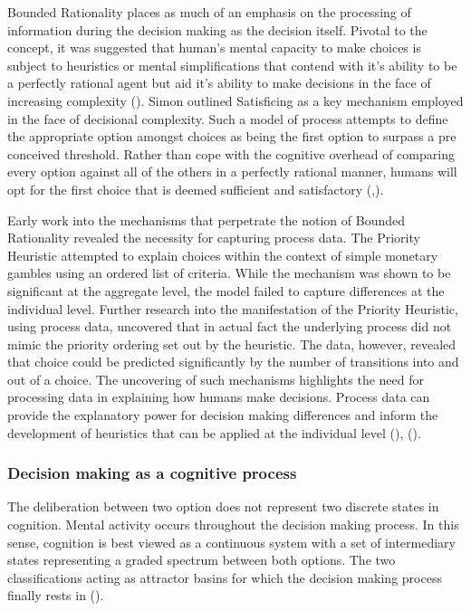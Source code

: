 \documentclass[man, floatsintext]{apa7}
\begin{document}
Bounded Rationality places as much of an emphasis on the processing of information during the decision making as the decision itself. Pivotal to the concept, it was suggested that human's mental capacity to make choices is subject to heuristics or mental simplifications that contend with it's ability to be a perfectly rational agent but aid it's ability to make decisions in the face of increasing complexity (\cite{payneTaskComplexityContingent1976}).  Simon outlined Satisficing as a key mechanism employed in the face of decisional complexity. Such a model of process attempts to define the appropriate option amongst choices as being the first option to surpass a pre conceived threshold. Rather than cope with the cognitive overhead of comparing every option against all of the others in a perfectly rational manner, humans will opt for the first choice that is deemed sufficient and satisfactory (\cite{simonBehavioralModelRational1955},\citeyear{simonRationalChoiceStructure1956d}).

Early work into the mechanisms that perpetrate the notion of Bounded Rationality revealed the necessity for capturing process data. The Priority Heuristic attempted to explain choices within the context of simple monetary gambles using an ordered list of criteria. While the mechanism was shown to be significant at the aggregate level, the model failed to capture differences at the individual level. Further research into the manifestation of the Priority Heuristic, using process data, uncovered that in actual fact the underlying process did not mimic the priority ordering set out by the heuristic. The data, however, revealed that choice could be predicted significantly by the number of transitions into and out of a choice. The uncovering of such mechanisms highlights the need for processing data in explaining how humans make decisions. Process data can provide the explanatory power for decision making differences and inform the development of heuristics that can be applied at the individual level (\cite{brandstatterPriorityHeuristicMaking2006}), (\cite{willemsenVisitingDecisionFactory2011}).

\subsubsection{Decision making as a cognitive process}

The deliberation between two option does not represent two discrete states in cognition. Mental activity occurs throughout the decision making process. In this sense, cognition is best viewed as a continuous system with a set of intermediary states representing a graded spectrum between both options. The two classifications acting as attractor basins for which the decision making process finally rests in (\cite{spiveyContinuousDynamicsRealTime2006}).
\end{document}
